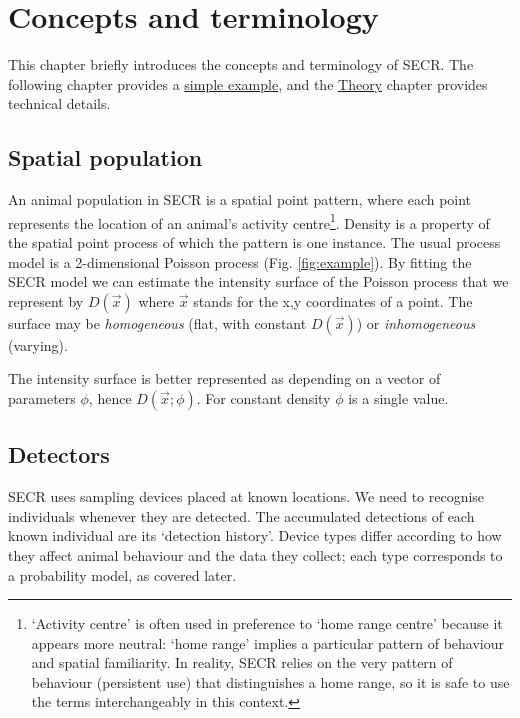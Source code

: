 \documentclass[
]{book}
\begin{document}
\chapter{Concepts and terminology}\label{Basics}

This chapter briefly introduces the concepts and terminology of SECR. The following chapter provides a \hyperref[Example]{simple example}, and the \hyperref[theory]{Theory} chapter provides technical details.

\section{Spatial population}\label{spatial-population}

An animal population in SECR is a spatial point pattern, where each point
represents the location of an animal's activity centre\footnote{`Activity centre' is often used in preference to `home range centre' because it appears more neutral: `home range' implies a particular pattern of behaviour and spatial familiarity. In reality, SECR relies on the very pattern of behaviour (persistent use) that distinguishes a home range, so it is safe to use the terms interchangeably in this context.}.
Density is a property of the spatial point process of which the pattern is one instance. The usual process model is a 2-dimensional Poisson process (Fig. \ref{fig:example}). By fitting the SECR model we can estimate the intensity surface of the Poisson process that we represent by \(D(\vec x)\) where \(\vec x\) stands for the x,y coordinates of a point. The surface may be \emph{homogeneous} (flat, with constant \(D(\vec x)\)) or \emph{inhomogeneous} (varying).

The intensity surface is better represented as depending on a vector of parameters \(\phi\), hence \(D(\vec x; \phi)\). For constant density \(\phi\) is a single value.

\section{Detectors}\label{detectors}

SECR uses sampling devices placed at known locations. We need to recognise individuals whenever they are detected. The accumulated detections of each known individual are its `detection history'. Device types differ according to how they affect animal behaviour and the data they collect; each type corresponds to a probability model, as covered later.
\end{document}
